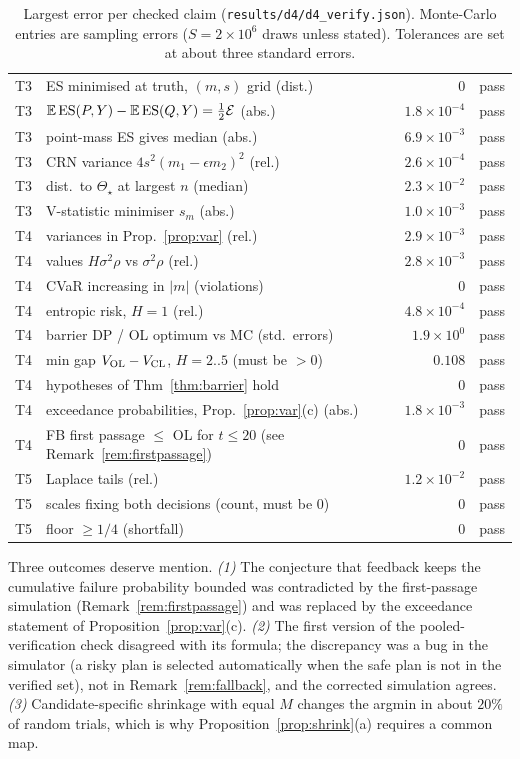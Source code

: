 \begin{table}[h]
\begin{tabular}{@{}llrl@{}}
T3 & ES minimised at truth, $(m,s)$ grid (dist.) & $0$ & pass\\
T3 & $\mathbb{E}\operatorname{ES}(P,Y)-\mathbb{E}\operatorname{ES}(Q,Y)=\frac12\mathcal E$ (abs.) & $1.8\!\times\!10^{-4}$ & pass\\
T3 & point-mass ES gives median (abs.) & $6.9\!\times\!10^{-3}$ & pass\\
T3 & CRN variance $4s^2(m_1-\epsilon m_2)^2$ (rel.) & $2.6\!\times\!10^{-4}$ & pass\\
T3 & dist.\ to $\Theta_\star$ at largest $n$ (median) & $2.3\!\times\!10^{-2}$ & pass\\
T3 & V-statistic minimiser $s_m$ (abs.) & $1.0\!\times\!10^{-3}$ & pass\\
T4 & variances in Prop.~\ref{prop:var} (rel.) & $2.9\!\times\!10^{-3}$ & pass\\
T4 & values $H\sigma^2\rho$ vs $\sigma^2\rho$ (rel.) & $2.8\!\times\!10^{-3}$ & pass\\
T4 & CVaR increasing in $|m|$ (violations) & $0$ & pass\\
T4 & entropic risk, $H=1$ (rel.) & $4.8\!\times\!10^{-4}$ & pass\\
T4 & barrier DP / OL optimum vs MC (std.\ errors) & $1.9\!\times\!10^{0}$ & pass\\
T4 & min gap $V_{\rm OL}-V_{\rm CL}$, $H=2..5$ (must be $>0$) & $0.108$ & pass\\
T4 & hypotheses of Thm~\ref{thm:barrier} hold & $0$ & pass\\
T4 & exceedance probabilities, Prop.~\ref{prop:var}(c) (abs.) & $1.8\!\times\!10^{-3}$ & pass\\
T4 & FB first passage $\le$ OL for $t\le20$ (see Remark~\ref{rem:firstpassage}) & $0$ & pass\\
T5 & Laplace tails (rel.) & $1.2\!\times\!10^{-2}$ & pass\\
T5 & scales fixing both decisions (count, must be 0) & $0$ & pass\\
T5 & floor $\ge1/4$ (shortfall) & $0$ & pass\\
\hline
\end{tabular}
\caption{Largest error per checked claim (\texttt{results/d4/d4\_verify.json}). Monte-Carlo entries are sampling errors ($S=2\times10^6$ draws unless stated). Tolerances are set at about three standard errors.}
\label{tab:verif}
\end{table}

Three outcomes deserve mention.
\emph{(1)} The conjecture that feedback keeps the cumulative failure probability bounded was contradicted by the first-passage simulation (Remark~\ref{rem:firstpassage}) and was replaced by the exceedance statement of Proposition~\ref{prop:var}(c).
\emph{(2)} The first version of the pooled-verification check disagreed with its formula; the discrepancy was a bug in the simulator (a risky plan is selected automatically when the safe plan is not in the verified set), not in Remark~\ref{rem:fallback}, and the corrected simulation agrees.
\emph{(3)} Candidate-specific shrinkage with equal $M$ changes the argmin in about $20\%$ of random trials, which is why Proposition~\ref{prop:shrink}(a) requires a common map.
